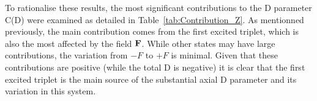 \documentclass[12pt,a4paper]{report}
\numberwithin{equation}{section}
\begin{document}
To rationalise these results, the most significant contributions to the D parameter C(D) were examined as detailed in Table~\ref{tab:Contribution_Z}.
As mentionned previously, the main contribution comes from the first excited triplet, which is also the most affected by the field $\vb F$.
While other states may have large contributions, the variation from $-F$ to $+F$ is minimal. 
Given that these contributions are positive (while the total D is negative) it is clear that the first excited triplet is the main source of the substantial axial D parameter and its variation in this system.


\begin{table}[h]
    \centering
\end{table}
\end{document}
